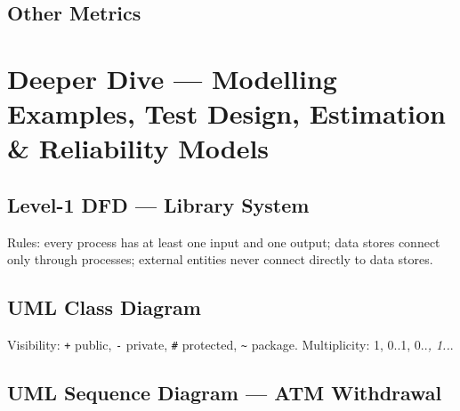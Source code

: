 \needspace{95pt}

\hypertarget{p2-06--other-metrics}{%
\subsection{Other Metrics}\label{p2-06--other-metrics}}



\needspace{131pt}

\hypertarget{p2-06--9-deeper-dive--modelling-examples-test-design-estimation--reliability-models}{%
\section{Deeper Dive --- Modelling Examples, Test Design, Estimation \& Reliability Models}\label{p2-06--9-deeper-dive--modelling-examples-test-design-estimation--reliability-models}}

\needspace{95pt}

\hypertarget{p2-06--91-level-1-dfd--library-system}{%
\subsection{Level-1 DFD --- Library System}\label{p2-06--91-level-1-dfd--library-system}}



Rules: every process has at least one input and one output; data stores connect only through processes; external entities never connect directly to data stores.

\needspace{95pt}

\hypertarget{p2-06--92-uml-class-diagram}{%
\subsection{UML Class Diagram}\label{p2-06--92-uml-class-diagram}}



Visibility: \texttt{+} public, \texttt{-} private, \texttt{\#} protected, \texttt{\textasciitilde{}} package. Multiplicity: 1, 0..1, 0..\emph{, 1..}.

\needspace{95pt}

\hypertarget{p2-06--93-uml-sequence-diagram--atm-withdrawal}{%
\subsection{UML Sequence Diagram --- ATM Withdrawal}\label{p2-06--93-uml-sequence-diagram--atm-withdrawal}}

